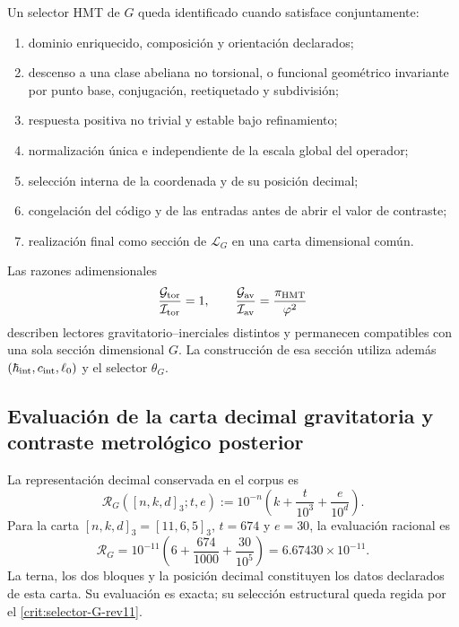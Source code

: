 \begin{criterion}
\label{crit:selector-G-rev11}
Un selector HMT de \(G\) queda identificado cuando satisface conjuntamente:
\begin{enumerate}
 \item dominio enriquecido, composición y orientación declarados;
 \item descenso a una clase abeliana no torsional, o funcional geométrico
 invariante por punto base, conjugación, reetiquetado y subdivisión;
 \item respuesta positiva no trivial y estable bajo refinamiento;
 \item normalización única e independiente de la escala global del operador;
 \item selección interna de la coordenada y de su posición decimal;
 \item congelación del código y de las entradas antes de abrir el valor de
 contraste;
 \item realización final como sección de \(\mathcal L_G\) en una carta
 dimensional común.
\end{enumerate}
\end{criterion}

Las razones adimensionales
\[
 \frac{\mathcal G_{\rm tor}}{\mathcal I_{\rm tor}}=1,
 \qquad
 \frac{\mathcal G_{\rm av}}{\mathcal I_{\rm av}}
 =\frac{\pi_{\rm HMT}}{\varphi^2}
\]
describen lectores gravitatorio--inerciales distintos y permanecen
compatibles con una sola sección dimensional \(G\). La construcción de esa
sección utiliza además
\((\hbar_{\rm int},c_{\rm int},\ell_0)\) y el selector \(\theta_G\).

\subsection{Evaluación de la carta decimal gravitatoria y contraste metrológico posterior}

La representación decimal conservada en el corpus es
\begin{equation}
 \mathscr R_G([n,k,d]_3;t,e)
 :=10^{-n}\left(k+\frac{t}{10^3}+\frac{e}{10^d}\right).
 \label{eq:lector-decimal-G-rev11}
\end{equation}
Para la carta
\([n,k,d]_3=[11,6,5]_3\), \(t=674\) y \(e=30\), la evaluación racional es
\begin{equation}
 \boxed{
 \mathscr R_G
 =10^{-11}\left(6+\frac{674}{1000}+\frac{30}{10^5}\right)
 =6.67430\times10^{-11}.}
 \label{eq:evaluacion-decimal-G-rev11}
\end{equation}
La terna, los dos bloques y la posición decimal constituyen los datos
declarados de esta carta. Su evaluación es exacta; su selección estructural
queda regida por el \cref{crit:selector-G-rev11}.

